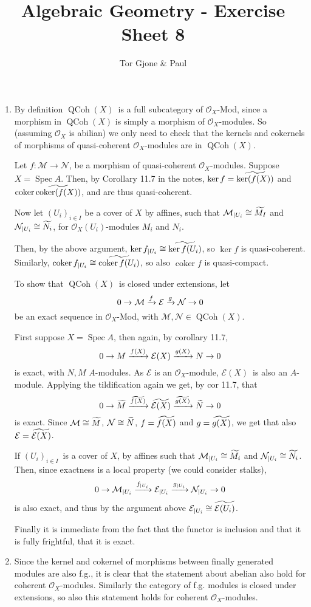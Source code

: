 \documentclass[a5paper,11pt,english]{article}
\title{\textbf{Algebraic Geometry} - Exercise Sheet 8}
\author{Tor Gjone \& Paul}
\DeclareMathOperator{\Spec}{Spec}
\DeclareMathOperator{\coker}{coker}
\renewcommand{\O}{\mathcal{O}}
\DeclareMathOperator{\QCoh}{QCoh}
\renewcommand{\E}{\mathcal{E}}
\newcommand{\M}{\mathcal{M}}
\renewcommand{\N}{\mathcal{N}}
\begin{document}
\mmaketitle


\begin{exercise}[1]
\begin{enumerate}
\item
By definition $\QCoh(X)$ is a full subcategory of $\O_X$-Mod, since a morphism
in $\QCoh(X)$ is simply a morphism of $\O_X$-modules. So (assuming $\O_X$ is
abilian) we only need to check that the kernels and cokernels of morphisms of
quasi-coherent $\O_X$-modules are in $\QCoh(X)$.

Let $f : \M \to \N$, be a morphism of quasi-coherent $\O_X$-modules. 
Suppose $X = \Spec A$. Then, by Corollary 11.7 in the notes, 
$\ker f = \widetilde{\ker (f(X))}$ and $\coker \til{\coker (f(X))}$, and are
thus quasi-coherent.

Now let $(U_i)_{i\in I}$ be a cover of $X$ by affines, such that $\M_{|U_i}
\cong \til {M_I}$ and $\N_{|U_i} \cong \til{N_i}$, for $\O_X(U_i)$-modules
$M_i$ and $N_i$.

Then, by the above argument, $\ker f_{|U_i} \cong \widetilde{\ker f(U_i)}$, so $\ker
f$ is quasi-coherent. Similarly, $\coker f_{|U_i} \cong \til{\coker
f(U_i)}$, so also $\coker f$ is quasi-compact.


To show that $\QCoh(X)$ is closed under extensions, let 
\[ 0 \to \M \xto{f} \E \xto{g} \N \to 0 \]
be an exact sequence in $\O_X$-Mod, with $\M,\N \in \QCoh(X)$.

First suppose $X = \Spec A$, then again, by corollary 11.7,  
\[ 0 \to M \xto{f(X)} \E(X) \xto{g(X)} N \to 0 \]
is exact, with $N,M$ $A$-modules. As $\E$ is an $\O_X$-module, $\E(X)$ is also
an $A$-module. Applying the tildification again we get, by cor 11.7, that 
\[ 0 \to \til M \xto{\til{f(X)}} \til{\E(X)} \xto{\til{g(X)}} \til N \to 0 \]
is exact. Since $\M \cong \til M$, $\N \cong \til N$, $f = \widetilde{f(X)}$ and $g =
\widetilde{g(X)}$, we get that also $\E = \til {\E(X)}$.


If $(U_i)_{i\in I}$ is a cover of $X$, by affines such that $\M_{|U_i} \cong
\til {M_i}$ and $\N_{|U_i} \cong \til {N_i}$. Then, since exactness is a local
property (we could consider stalks),
\[ 0 \to \M_{|U_i} \xto{f_{|U_i}} \E_{|U_i} \xto{g_{|U_i}} \N_{|U_i} \to 0 \]
is also exact, and thus by the argument above $\E_{|U_i} \cong \til {\E(U_i)}$.


Finally it is immediate from the fact that the functor is inclusion and that it is
fully frightful, that it is exact.

\item
Since the kernel and cokernel of morphisms between finally generated modules are
also f.g., it is clear that the statement about abelian also hold for coherent
$\O_X$-modules. Similarly the category of f.g. modules is closed under
extensions, so also this statement holds for coherent $\O_X$-modules. 

\end{enumerate}
\end{exercise}
\end{document}
